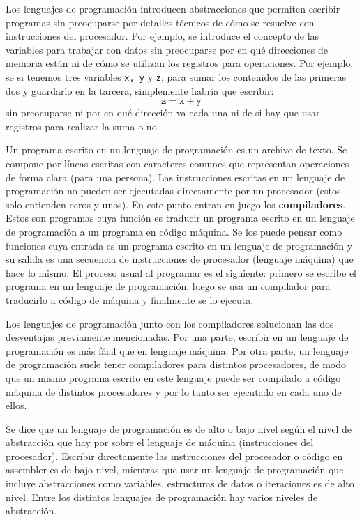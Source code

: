 \documentclass[a4paper, 12pt]{report}
\begin{document}
Los lenguajes de programación introducen abstracciones que permiten escribir programas sin preocuparse por detalles técnicos de cómo se resuelve con instrucciones del procesador. Por ejemplo, se introduce el concepto de las variables para trabajar con datos sin preocuparse por en qué direcciones de memoria están ni de cómo se utilizan los registros para operaciones. Por ejemplo, se si tenemos tres variables {\tt x, y} y {\tt z}, para sumar los contenidos de las primeras dos y guardarlo en la tarcera, simplemente habría que escribir:
$$\mathtt{z} = \mathtt{x}+\mathtt{y}
$$
sin preocuparse ni por en qué dirección va cada una ni de si hay que usar registros para realizar la suma o no.

Un programa escrito en un lenguaje de programación es un archivo de texto. Se compone por líneas escritas con caracteres comunes que representan operaciones de forma clara (para una persona). Las instrucciones escritas en un lenguaje de programación no pueden ser ejecutadas directamente por un procesador (estos solo entienden ceros y unos). En este punto entran en juego los {\bf compiladores}. Estos son programas cuya función es traducir un programa escrito en un lenguaje de programación a un programa en código máquina. Se los puede pensar como funciones cuya entrada es un programa escrito en un lenguaje de programación y su salida es una secuencia de instrucciones de procesador (lenguaje máquina) que hace lo mismo. El proceso usual al programar es el siguiente: primero se escribe el programa en un lenguaje de programación, luego se usa un compilador para traducirlo a código de máquina y finalmente se lo ejecuta.

Los lenguajes de programación junto con los compiladores solucionan las dos desventajas previamente mencionadas. Por una parte, escribir en un lenguaje de programación es más fácil que en lenguaje máquina. Por otra parte, un lenguaje de programación suele tener compiladores para distintos procesadores, de modo que un mismo programa escrito en este lenguaje puede ser compilado a código máquina de distintos procesadores y por lo tanto ser ejecutado en cada uno de ellos.

Se dice que un lenguaje de programación es de alto o bajo nivel según el nivel de abstracción que hay por sobre el lenguaje de máquina (instrucciones del procesador). Escribir directamente las instrucciones del procesador o código en assembler es de bajo nivel, mientras que usar un lenguaje de programación que incluye abstracciones como variables, estructuras de datos o iteraciones es de alto nivel. Entre los distintos lenguajes de programación hay varios niveles de abstracción.
\end{document}
